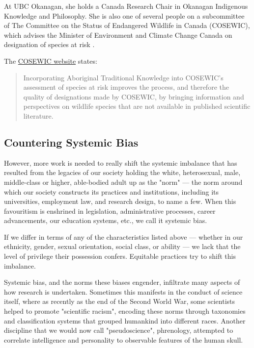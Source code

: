 \documentclass[
]{book}
\begin{document}
At UBC Okanagan, she holds a Canada Research Chair in Okanagan Indigenous Knowledge and Philosophy. She is also one of several people on a subcommittee of The Committee on the Status of Endangered Wildlife in Canada (COSEWIC), which advises the Minister of Environment and Climate Change Canada on designation of species at risk \citep{li_jeannettes_nodate} \citep{committee_on_the_status_of_endangered_wildlife_in_canada_atk_nodate}.

The \href{https://cosewic.ca/index.php/en-ca/about-us/cosewic-subcommittees}{COSEWIC website} states:

\begin{quote}
Incorporating Aboriginal Traditional Knowledge into COSEWIC's assessment of species at risk improves the process, and therefore the quality of designations made by COSEWIC, by bringing information and perspectives on wildlife species that are not available in published scientific literature.
\end{quote}

\hypertarget{countering-systemic-bias}{%
\subsection*{Countering Systemic Bias}\label{countering-systemic-bias}}

However, more work is needed to really shift the systemic imbalance that has resulted from the legacies of our society holding the white, heterosexual, male, middle-class or higher, able-bodied adult up as the "norm" --- the norm around which our society constructs its practices and institutions, including its universities, employment law, and research design, to name a few. When this favouritism is enshrined in legislation, administrative processes, career advancements, our education systems, etc., we call it systemic bias.

If we differ in terms of any of the characteristics listed above --- whether in our ethnicity, gender, sexual orientation, social class, or ability --- we lack that the level of privilege their possession confers. Equitable practices try to shift this imbalance.

Systemic bias, and the norms these biases engender, infiltrate many aspects of how research is undertaken. Sometimes this manifests in the conduct of science itself, where as recently as the end of the Second World War, some scientists helped to promote "scientific racism", encoding these norms through taxonomies and classification systems that grouped humankind into different races. Another discipline that we would now call "pseudoscience", phrenology, attempted to correlate intelligence and personality to observable features of the human skull.
\end{document}
